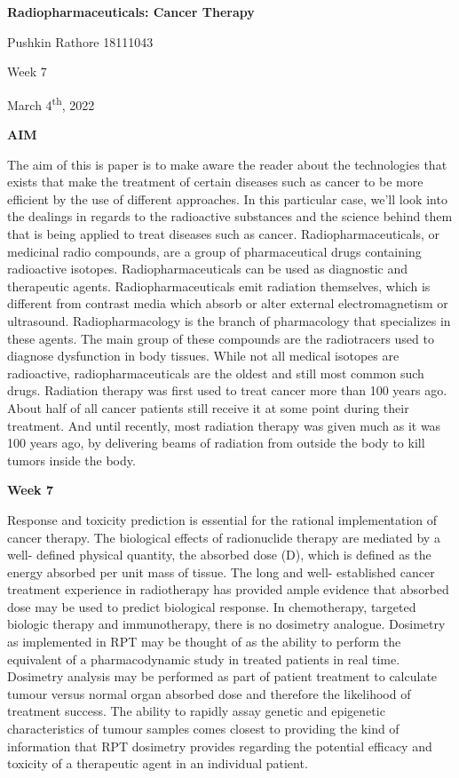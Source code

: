 \documentclass[
]{article}
\author{}
\date{}
\begin{document}
\textbf{{Radiopharmaceuticals: Cancer Therapy}}

Pushkin Rathore 18111043

Week 7

March 4\textsuperscript{th}, 2022

\textbf{AIM}

The aim of this is paper is to make aware the reader about the
technologies that exists that make the treatment of certain diseases
such as cancer to be more efficient by the use of different approaches.
In this particular case, we'll look into the dealings in regards to the
radioactive substances and the science behind them that is being applied
to treat diseases such as cancer. Radiopharmaceuticals, or medicinal
radio compounds, are a group of pharmaceutical drugs containing
radioactive isotopes. Radiopharmaceuticals can be used as diagnostic and
therapeutic agents. Radiopharmaceuticals emit radiation themselves,
which is different from contrast media which absorb or alter external
electromagnetism or ultrasound. Radiopharmacology is the branch of
pharmacology that specializes in these agents. The main group of these
compounds are the radiotracers used to diagnose dysfunction in body
tissues. While not all medical isotopes are radioactive,
radiopharmaceuticals are the oldest and still most common such drugs.
Radiation therapy was first used to treat cancer more than 100 years
ago. About half of all cancer patients still receive it at some point
during their treatment. And until recently, most radiation therapy was
given much as it was 100 years ago, by delivering beams of radiation
from outside the body to kill tumors inside the body.

\textbf{Week 7}

Response and toxicity prediction is essential for the rational
implementation of cancer therapy. The biological effects of radionuclide
therapy are mediated by a well- defined physical quantity, the absorbed
dose (D), which is defined as the energy absorbed per unit mass of
tissue. The long and well- established cancer treatment experience in
radiotherapy has provided ample evidence that absorbed dose may be used
to predict biological response. In chemotherapy, targeted biologic
therapy and immunotherapy, there is no dosimetry analogue. Dosimetry as
implemented in RPT may be thought of as the ability to perform the
equivalent of a pharmacodynamic study in treated patients in real time.
Dosimetry analysis may be performed as part of patient treatment to
calculate tumour versus normal organ absorbed dose and therefore the
likelihood of treatment success. The ability to rapidly assay genetic
and epigenetic characteristics of tumour samples comes closest to
providing the kind of information that RPT dosimetry provides regarding
the potential efficacy and toxicity of a therapeutic agent in an
individual patient.
\end{document}
